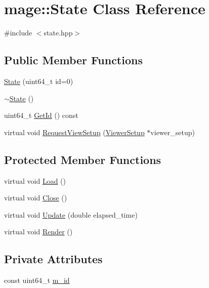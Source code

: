 \hypertarget{classmage_1_1_state}{}\section{mage\+:\+:State Class Reference}
\label{classmage_1_1_state}


{\ttfamily \#include $<$state.\+hpp$>$}

\subsection*{Public Member Functions}
\begin{DoxyCompactItemize}
\item 
\hyperlink{classmage_1_1_state_ac21bb6de22bb3b9c1b18d98b53e92100}{State} (uint64\+\_\+t id=0)
\item 
\hyperlink{classmage_1_1_state_aa970b0dd628870e72a7f7fffcff1db13}{$\sim$\+State} ()
\item 
uint64\+\_\+t \hyperlink{classmage_1_1_state_a07c383a809204ba12a2bbfb22d2977d5}{Get\+Id} () const
\item 
virtual void \hyperlink{classmage_1_1_state_a352431f7b9c067bc45f922b782d6b407}{Request\+View\+Setup} (\hyperlink{structmage_1_1_viewer_setup}{Viewer\+Setup} $\ast$viewer\+\_\+setup)
\end{DoxyCompactItemize}
\subsection*{Protected Member Functions}
\begin{DoxyCompactItemize}
\item 
virtual void \hyperlink{classmage_1_1_state_aa88ace504c82ad372e5e599746f3ebda}{Load} ()
\item 
virtual void \hyperlink{classmage_1_1_state_a1edd5d756566f5b689c7a381f4e6b301}{Close} ()
\item 
virtual void \hyperlink{classmage_1_1_state_afbee8caa84e0c69ac5757f7e5e87317f}{Update} (double elapsed\+\_\+time)
\item 
virtual void \hyperlink{classmage_1_1_state_a6e3b3f55bfd5be86a02783a2f76c9709}{Render} ()
\end{DoxyCompactItemize}
\subsection*{Private Attributes}
\begin{DoxyCompactItemize}
\item 
const uint64\+\_\+t \hyperlink{classmage_1_1_state_ab135514ec2250e9680b35cfab4e91cab}{m\+\_\+id}
\end{DoxyCompactItemize}
